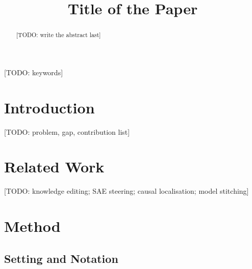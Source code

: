 \documentclass[conference]{IEEEtran}
\newcommand{\todo}[1]{{\color{red}[TODO: #1]}}
\begin{document}
\title{Title of the Paper}

\author{
}

\maketitle

\begin{abstract}
\todo{write the abstract last}
\end{abstract}

\begin{IEEEkeywords}
\todo{keywords}
\end{IEEEkeywords}

\section{Introduction}\label{sec:intro}
\todo{problem, gap, contribution list}

\section{Related Work}\label{sec:related}
\todo{knowledge editing; SAE steering; causal localisation; model stitching}

\section{Method}\label{sec:method}
\subsection{Setting and Notation}
\end{document}
